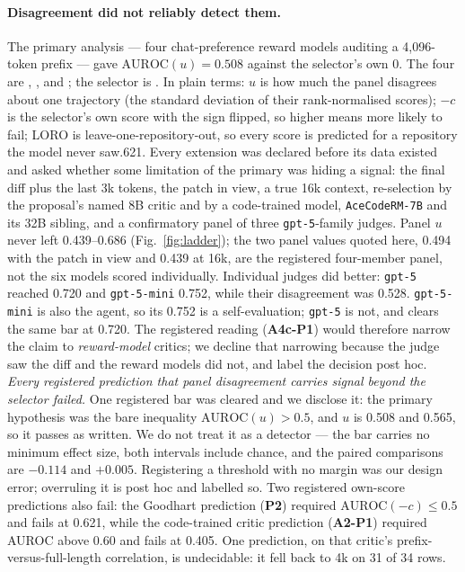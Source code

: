 \documentclass[10pt]{article}
\begin{document}
\paragraph{Disagreement did not reliably detect them.}
The primary analysis --- four chat-preference reward models auditing a 4{,}096-token prefix --- gave $\mathrm{AUROC}(u)=0.508$ against the selector's own 0. The four are , ,  and ; the selector is . In plain terms: $u$ is how much the panel disagrees about one trajectory (the standard deviation of their rank-normalised scores); $-c$ is the selector's own score with the sign flipped, so higher means more likely to fail; LORO is leave-one-repository-out, so every score is predicted for a repository the model never saw.621. Every extension was declared before its data existed and asked whether some limitation of the primary was hiding a signal: the final diff plus the last 3k tokens, the patch in view, a true 16k context, re-selection by the proposal's named 8B critic and by a code-trained model, \texttt{AceCodeRM-7B} and its 32B sibling, and a confirmatory panel of three \texttt{gpt-5}-family judges. Panel $u$ never left 0.439--0.686 (Fig.~\ref{fig:ladder}); the two panel values quoted here, 0.494 with the patch in view and 0.439 at 16k, are the registered four-member panel, not the six models scored individually. Individual judges did better: \texttt{gpt-5} reached 0.720 and \texttt{gpt-5-mini} 0.752, while their disagreement was 0.528. \texttt{gpt-5-mini} is also the agent, so its 0.752 is a self-evaluation; \texttt{gpt-5} is not, and clears the same bar at 0.720. The registered reading (\textbf{A4c-P1}) would therefore narrow the claim to \emph{reward-model} critics; we decline that narrowing because the judge saw the diff and the reward models did not, and label the decision post hoc. \emph{Every registered prediction that panel disagreement carries signal beyond the selector failed.} One registered bar was cleared and we disclose it: the primary hypothesis was the bare inequality $\mathrm{AUROC}(u) > 0.5$, and $u$ is 0.508 and 0.565, so it passes as written. We do not treat it as a detector --- the bar carries no minimum effect size, both intervals include chance, and the paired comparisons are $-0.114$ and $+0.005$. Registering a threshold with no margin was our design error; overruling it is post hoc and labelled so. Two registered own-score predictions also fail: the Goodhart prediction (\textbf{P2}) required $\mathrm{AUROC}(-c)\le 0.5$ and fails at 0.621, while the code-trained critic prediction (\textbf{A2-P1}) required AUROC above 0.60 and fails at 0.405. One prediction, on that critic's prefix-versus-full-length correlation, is undecidable: it fell back to 4k on 31 of 34 rows.
\end{document}
